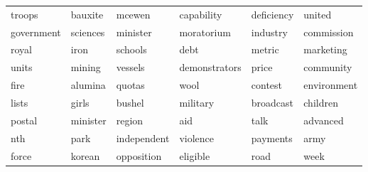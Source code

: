 \documentclass{beamer}       %
\begin{document}
\begin{frame}
\begin{table}[h!]
\begin{tabular}{llllll}
\cellcolor{green!25}troops       & bauxite      & mcewen      & capability    & deficiency     & united      \\
\cellcolor{gray!25}government   & sciences     & \cellcolor{gray!25}minister    & moratorium    & \cellcolor{yellow!25}industry       & commission  \\
royal        & \cellcolor{yellow!25}iron         & schools     & \cellcolor{orange!25}debt          & metric         & marketing   \\
units        & \cellcolor{yellow!25}mining       & vessels     & demonstrators & \cellcolor{orange!25}price          & community   \\
fire         & alumina      & quotas      & \cellcolor{red!25}wool          & contest        & \cellcolor{red!25}environment \\
lists        & girls        & \cellcolor{red!25}bushel      & \cellcolor{green!25}military      & broadcast      & children    \\
postal       & \cellcolor{gray!25}minister     & region      & \cellcolor{orange!25}aid           & talk           & advanced    \\
nth          & park         & \cellcolor{gray!25}independent & violence      & \cellcolor{orange!25}payments       & \cellcolor{green!25}army        \\
\cellcolor{green!25}force        & korean       & \cellcolor{gray!25}opposition  & eligible      & \cellcolor{red!25}road           & week        \\
\bottomrule
\end{tabular}
\end{table}
\end{frame}
\end{document}

